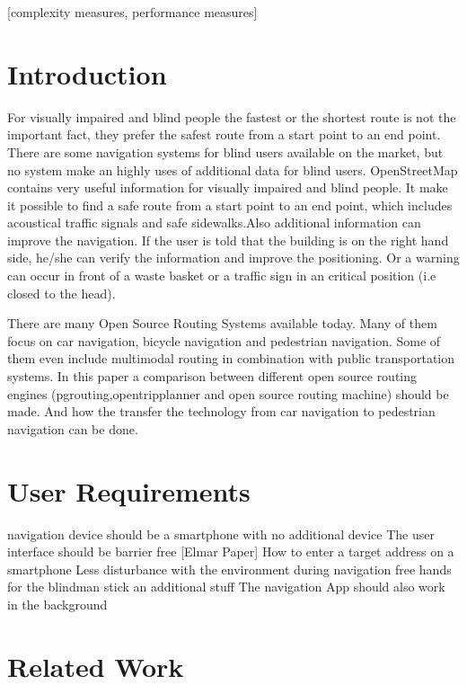\documentclass{sig-alternate}
\begin{document}
[complexity measures, performance measures]


\section{Introduction}
For visually impaired and blind people the fastest or the shortest route is not the important fact, they prefer the safest route from a start point to an end point. There are some navigation systems for blind users available on the market, but no system make an highly uses of additional data for blind users. 
OpenStreetMap contains very useful information for visually impaired and blind people. It make it possible to find a safe route from a start point to an end point, which includes acoustical traffic signals and safe sidewalks.Also additional information can improve the navigation. If the user is told that the building is on the right hand side, he/she can verify the information and improve the positioning. Or a warning can occur in front of a waste basket or a traffic sign in an critical position (i.e closed to the head). 
 
There are many Open Source Routing Systems available today. Many of them focus on car navigation, bicycle navigation and pedestrian navigation. Some of them even include multimodal routing in combination with public transportation systems. In this paper a comparison between different open source routing engines (pgrouting,opentripplanner and open source routing machine) should be made. And how the transfer the technology from car navigation to pedestrian navigation can be done. 
\section{User Requirements}
navigation device should be a smartphone with no additional device
The user interface should be barrier free [Elmar Paper]
How to enter a target address on a smartphone
Less disturbance with the environment
during navigation free hands for the blindman stick an additional stuff
The navigation App should also work in the background

\section{Related Work}
\end{document}
